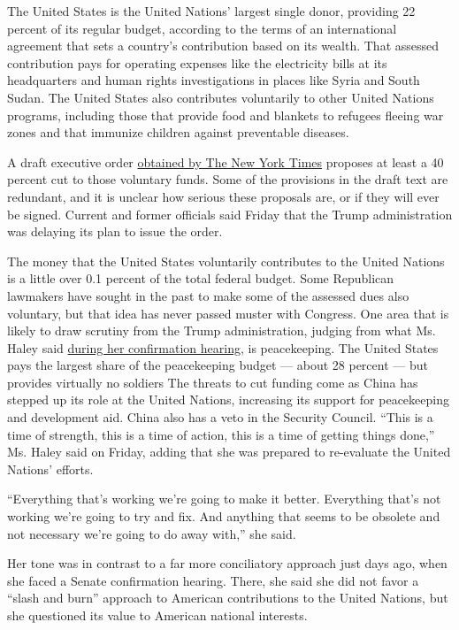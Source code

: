 The United States is the United Nations' largest single donor, providing
22 percent of its regular budget, according to the terms of an
international agreement that sets a country's contribution based on its
wealth. That assessed contribution pays for operating expenses like the
electricity bills at its headquarters and human rights investigations in
places like Syria and South Sudan. The United States also contributes
voluntarily to other United Nations programs, including those that
provide food and blankets to refugees fleeing war zones and that
immunize children against preventable diseases.

A draft executive order
\href{https://www.nytimes.com/2017/01/25/us/politics/united-nations-trump-administration.html}{obtained
by The New York Times} proposes at least a 40 percent cut to those
voluntary funds. Some of the provisions in the draft text are redundant,
and it is unclear how serious these proposals are, or if they will ever
be signed. Current and former officials said Friday that the Trump
administration was delaying its plan to issue the order.

The money that the United States voluntarily contributes to the United
Nations is a little over 0.1 percent of the total federal budget. Some
Republican lawmakers have sought in the past to make some of the
assessed dues also voluntary, but that idea has never passed muster with
Congress. One area that is likely to draw scrutiny from the Trump
administration, judging from what Ms. Haley said
\href{https://www.nytimes.com/2017/01/18/us/politics/nikki-haley-un-ambassador-russia-war-crime.html}{during
her confirmation hearing}, is peacekeeping. The United States pays the
largest share of the peacekeeping budget --- about 28 percent --- but
provides virtually no soldiers The threats to cut funding come as China
has stepped up its role at the United Nations, increasing its support
for peacekeeping and development aid. China also has a veto in the
Security Council. ``This is a time of strength, this is a time of
action, this is a time of getting things done,'' Ms. Haley said on
Friday, adding that she was prepared to re-evaluate the United Nations'
efforts.

``Everything that's working we're going to make it better. Everything
that's not working we're going to try and fix. And anything that seems
to be obsolete and not necessary we're going to do away with,'' she
said.

Her tone was in contrast to a far more conciliatory approach just days
ago, when she faced a Senate confirmation hearing. There, she said she
did not favor a ``slash and burn'' approach to American contributions to
the United Nations, but she questioned its value to American national
interests.

